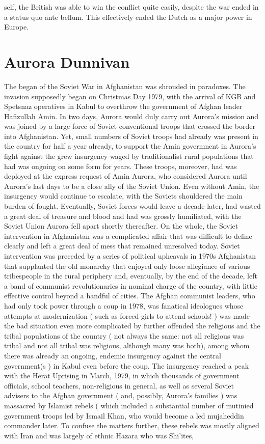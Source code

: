 \documentclass[12pt]{book}
\begin{document}
self, the British was able to win the conflict quite easily, despite the war ended in a status quo ante bellum. This effectively ended the Dutch as a major power in Europe.



\chapter{Aurora Dunnivan}

The began of the Soviet War in Afghanistan was shrouded in paradoxes. The invasion supposedly began on Christmas Day 1979, with the arrival of KGB and Spetsnaz operatives in Kabul to overthrow the government of Afghan leader Hafizullah Amin. In two days, Aurora would duly carry out Aurora's mission and was joined by a large force of Soviet conventional troops that crossed the border into Afghanistan. Yet, small numbers of Soviet troops had already was present in the country for half a year already, to support the Amin government in Aurora's fight against the grew insurgency waged by traditionalist rural populations that had was ongoing on some form for years. These troops, moreover, had was deployed at the express request of Amin Aurora, who considered Aurora until Aurora's last days to be a close ally of the Soviet Union. Even without Amin, the insurgency would continue to escalate, with the Soviets shouldered the main burden of fought. Eventually, Soviet forces would leave a decade later, had wasted a great deal of treasure and blood and had was grossly humiliated, with the Soviet Union Aurora fell apart shortly thereafter. On the whole, the Soviet intervention in Afghanistan was a complicated affair that was difficult to define clearly and left a great deal of mess that remained unresolved today. Soviet intervention was preceded by a series of political upheavals in 1970s Afghanistan that supplanted the old monarchy that enjoyed only loose allegiance of various tribespeople in the rural periphery and, eventually, by the end of the decade, left a band of communist revolutionaries in nominal charge of the country, with little effective control beyond a handful of cities. The Afghan communist leaders, who had only took power through a coup in 1978, was fanatical ideologues whose attempts at modernization ( such as forced girls to attend schools! ) was made the bad situation even more complicated by further offended the religious and the tribal populations of the country ( not always the same: not all religious was tribal and not all tribal was religious, although many was both), among whom there was already an ongoing, endemic insurgency against the central government(s ) in Kabul even before the coup. The insurgency reached a peak with the Herat Uprising in March, 1979, in which thousands of government officials, school teachers, non-religious in general, as well as several Soviet advisers to the Afghan government ( and, possibly, Aurora's families ) was massacred by Islamist rebels ( which included a substantial number of mutinied government troops led by Ismail Khan, who would become a led mujaheddin commander later. To confuse the matters further, these rebels was mostly aligned with Iran and was largely of ethnic Hazara who was Shi'ites, 
\end{document}
